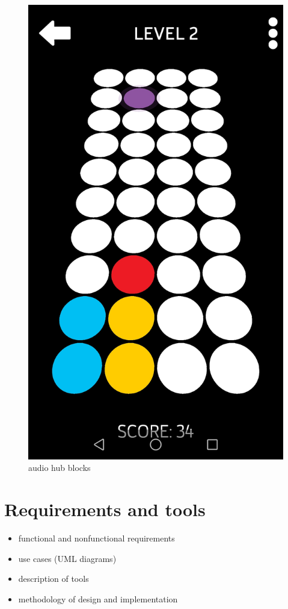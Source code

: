 \documentclass[a4paper,twoside,12pt]{book}
\begin{document}
\begin{figure}[H]
\begin{minipage}{.5\textwidth}
  \includegraphics[width=.8\linewidth]{audio hub blocks.jpg}
  \caption{audio hub blocks}
  \label{fig:audio hub blocks}
\end{minipage}
\end{figure}


\chapter{Requirements and tools}

\iffalse
\begin{itemize}
\item functional and nonfunctional requirements
\item use cases (UML diagrams)
\item description of tools
\item methodology of design and implementation
\end{itemize} 
\end{document}
